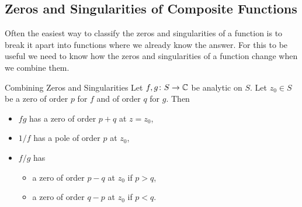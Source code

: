 \documentclass{article}
\begin{document}
    \subsection{Zeros and Singularities of Composite Functions}
    Often the easiest way to classify the zeros and singularities of a function is to break it apart into functions where we already know the answer.
    For this to be useful we need to know how the zeros and singularities of a function change when we combine them.
    \begin{lemma}{Combining Zeros and Singularities}{}
        Let \(f, g\colon S\to\mathbb{C}\) be analytic on \(S\).
        Let \(z_0\in S\) be a zero of order \(p\) for \(f\) and of order \(q\) for \(g\).
        Then
        \begin{itemize}
            \item \(fg\) has a zero of order \(p + q\) at \(z = z_0\),
            \item \(1/f\) has a pole of order \(p\) at \(z_0\),
            \item \(f/g\) has
            \begin{itemize}
                \item a zero of order \(p - q\) at \(z_0\) if \(p > q\),
                \item a zero of order \(q - p\) at \(z_0\) if \(p < q\).
            \end{itemize}
        \end{itemize}
    \end{lemma}
\end{document}
